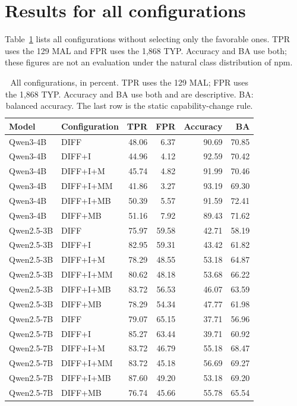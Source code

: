 \documentclass[a4paper,fleqn]{cas-dc}
\begin{document}
\section{Results for all configurations}\label{sec:appendix}
Table~\ref{tab:full} lists all configurations without selecting only the
favorable ones. TPR uses the 129 MAL and FPR uses the 1,868 TYP. Accuracy and BA
use both; these figures are not an evaluation under the natural class
distribution of npm.
\begin{table}[t]
\centering\small
\caption{All configurations, in percent. TPR uses the 129 MAL; FPR uses the 1,868 TYP. Accuracy and BA use both and are descriptive. BA: balanced accuracy. The last row is the static capability-change rule.}
\label{tab:full}
\begin{tabular}{llrrrr}
\toprule
Model & Configuration & TPR & FPR & Accuracy & BA \\
\midrule
Qwen3-4B & DIFF & 48.06 & 6.37 & 90.69 & 70.85 \\
Qwen3-4B & DIFF+I & 44.96 & 4.12 & 92.59 & 70.42 \\
Qwen3-4B & DIFF+I+M & 45.74 & 4.82 & 91.99 & 70.46 \\
Qwen3-4B & DIFF+I+MM & 41.86 & 3.27 & 93.19 & 69.30 \\
Qwen3-4B & DIFF+I+MB & 50.39 & 5.57 & 91.59 & 72.41 \\
Qwen3-4B & DIFF+MB & 51.16 & 7.92 & 89.43 & 71.62 \\
Qwen2.5-3B & DIFF & 75.97 & 59.58 & 42.71 & 58.19 \\
Qwen2.5-3B & DIFF+I & 82.95 & 59.31 & 43.42 & 61.82 \\
Qwen2.5-3B & DIFF+I+M & 78.29 & 48.55 & 53.18 & 64.87 \\
Qwen2.5-3B & DIFF+I+MM & 80.62 & 48.18 & 53.68 & 66.22 \\
Qwen2.5-3B & DIFF+I+MB & 83.72 & 56.53 & 46.07 & 63.59 \\
Qwen2.5-3B & DIFF+MB & 78.29 & 54.34 & 47.77 & 61.98 \\
Qwen2.5-7B & DIFF & 79.07 & 65.15 & 37.71 & 56.96 \\
Qwen2.5-7B & DIFF+I & 85.27 & 63.44 & 39.71 & 60.92 \\
Qwen2.5-7B & DIFF+I+M & 83.72 & 46.79 & 55.18 & 68.47 \\
Qwen2.5-7B & DIFF+I+MM & 83.72 & 45.18 & 56.69 & 69.27 \\
Qwen2.5-7B & DIFF+I+MB & 87.60 & 49.20 & 53.18 & 69.20 \\
Qwen2.5-7B & DIFF+MB & 76.74 & 45.66 & 55.78 & 65.54 \\

\end{tabular}
\end{table}
\end{document}
